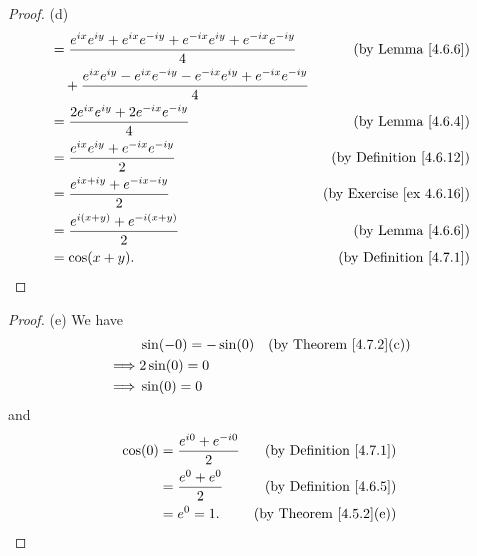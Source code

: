 \begin{proof}{(d)}
\begin{align*}
         & = \frac{e^{i x} e^{i y} + e^{i x} e^{- i y} + e^{- i x} e^{i y} + e^{- i x} e^{- i y}}{4}                                     & \text{(by Lemma \ref{4.6.6})}        \\
         & \quad + \frac{e^{i x} e^{i y} - e^{i x} e^{- i y} - e^{- i x} e^{i y} + e^{- i x} e^{- i y}}{4}                                                                      \\
         & = \frac{2 e^{i x} e^{i y} + 2 e^{- i x} e^{- i y}}{4}                                                                         & \text{(by Lemma \ref{4.6.4})}        \\
         & = \frac{e^{i x} e^{i y} + e^{- i x} e^{- i y}}{2}                                                                             & \text{(by Definition \ref{4.6.12})}  \\
         & = \frac{e^{i x + i y} + e^{- i x - i y}}{2}                                                                                   & \text{(by Exercise \ref{ex 4.6.16})} \\
         & = \frac{e^{i (x + y)} + e^{- i (x + y)}}{2}                                                                                   & \text{(by Lemma \ref{4.6.6})}        \\
         & = \cos(x + y).                                                                                                                & \text{(by Definition \ref{4.7.1})}
    \end{align*}
\end{proof}

\begin{proof}{(e)}
    We have
    \begin{align*}
                 & \sin(-0) = -\sin(0) & \text{(by Theorem \ref{4.7.2}(c))} \\
        \implies & 2 \sin(0) = 0                                            \\
        \implies & \sin(0) = 0
    \end{align*}
    and
    \begin{align*}
        \cos(0) & = \frac{e^{i 0} + e^{- i 0}}{2} & \text{(by Definition \ref{4.7.1})} \\
                & = \frac{e^{0} + e^{0}}{2}       & \text{(by Definition \ref{4.6.5})} \\
                & = e^0 = 1.                      & \text{(by Theorem \ref{4.5.2}(e))}
    \end{align*}
\end{proof}

